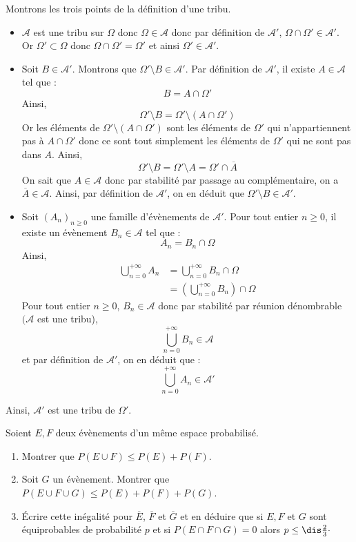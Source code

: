\documentclass[a4paper,10pt]{report}
\begin{document}
\corr Montrons les trois points de la définition d'une tribu.

\begin{itemize}
\item $\mathcal{A}$ est une tribu sur $\Omega$ donc $\Omega \in \mathcal{A}$ donc par définition de $\mathcal{A}'$, $ \Omega \cap \Omega' \in \mathcal{A}'$. Or $\Omega' \subset \Omega$ donc $ \Omega \cap \Omega' = \Omega'$ et ainsi $\Omega' \in \mathcal{A}'$.
\item Soit $B \in \mathcal{A}'$. Montrons que $\Omega' \setminus B \in \mathcal{A}'$. Par définition de $\mathcal{A}'$, il existe $A \in \mathcal{A}$ tel que :
$$ B = A \cap \Omega'$$
Ainsi,
$$ \Omega' \setminus B  = \Omega' \setminus  (A \cap \Omega') $$
Or les éléments de $\Omega' \setminus  (A \cap \Omega')$ sont les éléments de $\Omega'$ qui n'appartiennent pas à $A \cap \Omega'$ donc ce sont tout simplement les éléments de $\Omega'$ qui ne sont pas dans $A$. Ainsi,
$$  \Omega' \setminus B = \Omega' \setminus A = \Omega' \cap \overline{A}$$
On sait que $A \in \mathcal{A}$ donc par stabilité par passage au complémentaire, on a $\overline{A} \in \mathcal{A}$. Ainsi, par définition de $\mathcal{A}'$, on en déduit que $\Omega' \setminus B \in \mathcal{A}'$.
\item Soit $(A_n)_{n \geq 0}$ une famille d'évènements de $\mathcal{A}'$. Pour tout entier $n \geq 0$, il existe un évènement $B_n \in \mathcal{A}$ tel que :
$$ A_n = B_n \cap \Omega$$
Ainsi,
\begin{align*}
\bigcup_{n=0}^{+ \infty} A_n & = \bigcup_{n=0}^{+ \infty}B_n \cap \Omega \\
& = \left( \bigcup_{n=0}^{+ \infty}B_n \right) \cap \Omega
\end{align*}
Pour tout entier $n \geq 0$, $B_n \in \mathcal{A}$ donc par stabilité par réunion dénombrable $(\mathcal{A}$ est une tribu),
$$  \bigcup_{n=0}^{+ \infty}B_n \in \mathcal{A}$$
et par définition de $\mathcal{A}'$, on en déduit que :
$$ \bigcup_{n=0}^{+ \infty} A_n \in \mathcal{A}'$$
\end{itemize}
Ainsi, $\mathcal{A}'$ est une tribu de $\Omega'$.

\begin{Exercice}{}  Soient $E,F$ deux évènements d'un même espace probabilisé.
\begin{enumerate}
\item Montrer que $P(E \cup F) \leq P(E) + P(F)$.
\item Soit $G$ un évènement. Montrer que $P(E \cup F \cup G) \leq P(E) + P(F) + P(G)$.
\item Écrire cette inégalité pour $\overline{E}$, $\overline{F}$ et $\overline{G}$ et en déduire que si $E,F$ et $G$ sont équiprobables de probabilité $p$ et si $P(E \cap F \cap G)=0$ alors $p \leq \dis \frac{2}{3} \cdot$
\end{enumerate}
\end{Exercice}
\end{document}

